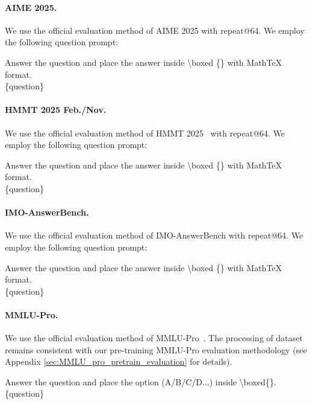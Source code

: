 \paragraph{AIME 2025.} We use the official evaluation method of AIME 2025\cite{AIME25} with repeat@64. We employ the following question prompt:

\begin{MyBox}{}

    Answer the question and place the answer inside \textbackslash boxed \{\} with MathTeX format. \\
    \{question\}
\end{MyBox}

\paragraph{HMMT 2025 Feb./Nov.} We use the official evaluation method of HMMT 2025~\cite{hmmt25} with repeat@64. We employ the following question prompt:

\begin{MyBox}{}
    Answer the question and place the answer inside \textbackslash boxed \{\} with MathTeX format. \\
    \{question\}
\end{MyBox}

\paragraph{IMO-AnswerBench.} We use the official evaluation method of IMO-AnswerBench\cite{luong2025towards} with repeat@64. We employ the following question prompt:

\begin{MyBox}{}

    Answer the question and place the answer inside \textbackslash boxed \{\} with MathTeX format. \\
    \{question\}
\end{MyBox}


\paragraph{MMLU-Pro.} We use the official evaluation method of MMLU-Pro~\cite{wang2024mmlupro}. The processing of dataset remains consistent with our pre-training MMLU-Pro evaluation methodology (see Appendix \ref{sec:MMLU_pro_pretrain_evaluation} for details).

\begin{MyBox}{}

Answer the question and place the option (A/B/C/D...) inside \textbackslash boxed\{\}.\newline
\newline
\{question\}
\end{MyBox}


